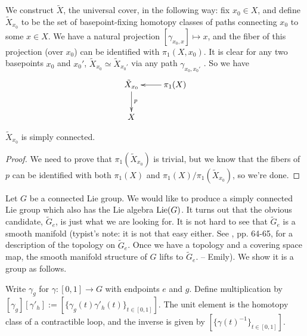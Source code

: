  We construct $\tilde X$, the universal cover, in the following way: fix
 $x_0\in X$, and define $\tilde X_{x_0}$ to be the set of basepoint-fixing homotopy
 classes of paths connecting $x_0$ to some $x \in X$.  We have a natural projection
 $[\gamma_{x_0,x}]\mapsto x$, and the fiber of this projection (over $x_0$) can be
 identified with $\pi_1(X,x_0)$. It is clear for any two basepoints $x_0$ and $x_0'$,
 $\tilde X_{x_0} \simeq \tilde X_{x_0'}$ via any path $\gamma_{x_0, x_0'}$ . So we
 have
 \[\xymatrix{
  \tilde X_{x_0} \ar[d]^{p} & \pi_1(X) \ar[l] \\
  X
 }\]
 \begin{claim}
   $\tilde X_{x_0}$ is simply connected.
 \end{claim}
 \begin{proof}
   We need to prove that $\pi_1(\tilde X_{x_0})$ is trivial, but we know that the
   fibers of $p$ can be identified with both $\pi_1(X)$ and $\pi_1(X)/\pi_1(\tilde
   X_{x_0})$, so we're done.
 \end{proof}

 Let $G$ be a connected Lie group.  We would like to produce a simply connected Lie
 group which also has the Lie algebra $\operatorname{Lie}(G)$.  It turns out that the obvious
 candidate, $\tilde G_e$, is just what we are looking for. It is not hard to see that
 $\tilde G_e$ is a smooth manifold (typist's note:  it is not that easy either.  See
 \cite{Hatcher}, pp. 64-65, for a description of the topology on $\tilde G_e$.  Once we have
 a topology and a covering space map, the smooth manifold structure of $G$ lifts to
 $\tilde G_e$. -- Emily).  We show it is a group as follows.

 Write $\gamma_g$ for $\gamma:[0,1]\to
 G$ with endpoints $e$ and $g$.  Define multiplication by
 $[\gamma_g][\gamma'_h]:=[\{\gamma_g(t)\gamma'_h(t)\}_{t\in [0,1]}]$.
 The unit element is the homotopy class of a contractible loop, and the inverse is
 given by $[\{\gamma(t)^{-1}\}_{t\in [0,1]}]$.

